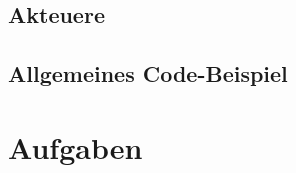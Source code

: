\documentclass{lehramt-informatik-haupt}
\begin{document}
%

\section{Akteuere}

\section{Allgemeines Code-Beispiel}


\chapter{Aufgaben}

\literatur
\end{document}
